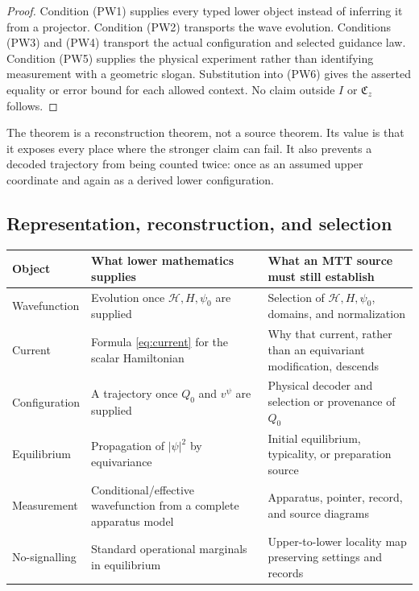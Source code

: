 \documentclass[11pt]{article}
\theoremstyle{definition}
\theoremstyle{remark}
\newcommand{\cH}{\mathcal H}
\begin{document}
\begin{proof}
Condition (PW1) supplies every typed lower object instead of inferring it
from a projector.  Condition (PW2) transports the wave evolution.
Conditions (PW3) and (PW4) transport the actual configuration and selected
guidance law.  Condition (PW5) supplies the physical experiment rather than
identifying measurement with a geometric slogan.  Substitution into (PW6)
gives the asserted equality or error bound for each allowed context.  No
claim outside \(I\) or \(\mathfrak C_z\) follows.
\end{proof}

The theorem is a reconstruction theorem, not a source theorem.  Its value is
that it exposes every place where the stronger claim can fail.  It also
prevents a decoded trajectory from being counted twice: once as an assumed
upper coordinate and again as a derived lower configuration.

\subsection{Representation, reconstruction, and selection}

\begin{center}
\small
\begin{tabularx}{\textwidth}{@{}p{}X X@{}}
\toprule
Object & What lower mathematics supplies & What an MTT source must still establish \\
\midrule
Wavefunction
& Evolution once \(\cH,H,\psi_0\) are supplied
& Selection of \(\cH,H,\psi_0\), domains, and normalization \\
Current
& Formula \cref{eq:current} for the scalar Hamiltonian
& Why that current, rather than an equivariant modification, descends \\
Configuration
& A trajectory once \(Q_0\) and \(v^\psi\) are supplied
& Physical decoder and selection or provenance of \(Q_0\) \\
Equilibrium
& Propagation of \(|\psi|^2\) by equivariance
& Initial equilibrium, typicality, or preparation source \\
Measurement
& Conditional/effective wavefunction from a complete apparatus model
& Apparatus, pointer, record, and source diagrams \\
No-signalling
& Standard operational marginals in equilibrium
& Upper-to-lower locality map preserving settings and records \\
\bottomrule
\end{tabularx}
\end{center}
\end{document}

